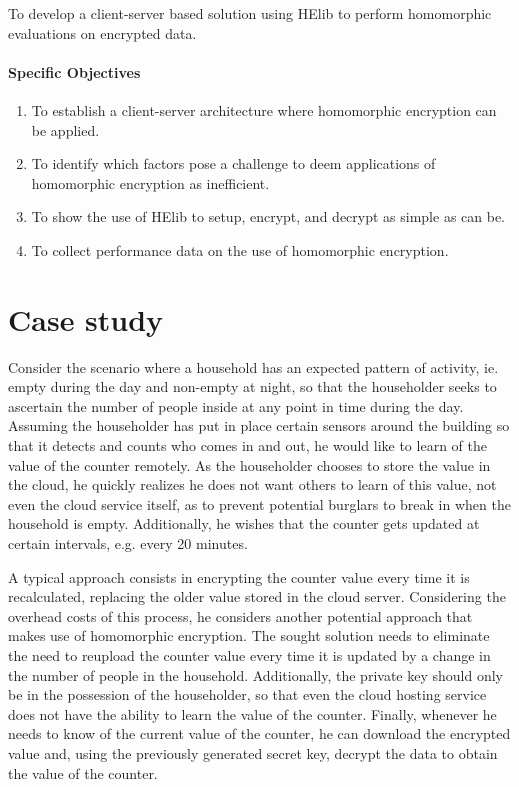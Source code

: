 To develop a client-server based solution using HElib to perform homomorphic evaluations on encrypted data.

\paragraph{Specific Objectives}
\begin{enumerate}
\item To establish a client-server architecture where homomorphic encryption can be applied.
\item To identify which factors pose a challenge to deem applications of homomorphic encryption as inefficient.
\item To show the use of HElib to setup, encrypt, and decrypt as simple as can be.
\item To collect performance data on the use of homomorphic encryption.
\end{enumerate}

\section{Case study}

Consider the scenario where a household has an expected pattern of activity, ie. empty during the day and non-empty at night, so that the householder seeks to ascertain the number of people inside at any point in time during the day. Assuming the householder has put in place certain sensors around the building so that it detects and counts who comes in and out, he would like to learn of the value of the counter remotely. As the householder chooses to store the value in the cloud, he quickly realizes he does not want others to learn of this value, not even the cloud service itself, as to prevent potential burglars to break in when the household is empty. Additionally, he wishes that the counter gets updated at certain intervals, e.g. every 20 minutes. 

A typical approach consists in encrypting the counter value every time it is recalculated, replacing the older value stored in the cloud server. Considering the overhead costs of this process, he considers another potential approach that makes use of homomorphic encryption. The sought solution needs to eliminate the need to reupload the counter value every time it is updated by a change in the number of people in the household. Additionally, the private key should only be in the possession of the householder, so that even the cloud hosting service does not have the ability to learn the value of the counter. Finally, whenever he needs to know of the current value of the counter, he can download the encrypted value and, using the previously generated secret key, decrypt the data to obtain the value of the counter.

